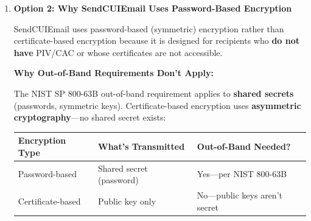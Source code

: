 \documentclass[11pt,letterpaper]{article}
\newcommand{\dmsection}[1]{\item \textbf{#1}\par}
\begin{document}
\begin{enumerate}
\textbf{Implementation (Outlook):}
\begin{enumerate}
    \item Compose email with CUI files attached
    \item Click \textbf{Sign} (uses your PIV/CAC private key)
    \item Click \textbf{Encrypt} (uses recipient's public certificate)
    \item Send
\end{enumerate}

\textbf{When to Use:}
\begin{itemize}
    \item Both parties have PIV/CAC with valid certificates
    \item Recipient's certificate is accessible (same organization, directory service, or previously exchanged)
    \item Regular communication with established recipients
\end{itemize}

\textbf{Note:} In this scenario, SendCUIEmail is \textbf{not needed}---use Outlook's native S/MIME instead.

\dmsection{Option 2: Why SendCUIEmail Uses Password-Based Encryption}

SendCUIEmail uses password-based (symmetric) encryption rather than certificate-based encryption because it is designed for recipients who \textbf{do not have} PIV/CAC or whose certificates are not accessible.

\textbf{Why Out-of-Band Requirements Don't Apply:}

The NIST SP 800-63B out-of-band requirement applies to \textbf{shared secrets} (passwords, symmetric keys). Certificate-based encryption uses \textbf{asymmetric cryptography}---no shared secret exists:

\begin{tabularx}{\textwidth}{|l|l|X|}
\hline
\textbf{Encryption Type} & \textbf{What's Transmitted} & \textbf{Out-of-Band Needed?} \\
\hline
Password-based & Shared secret (password) & Yes---per NIST 800-63B \\
\hline
Certificate-based & Public key only & No---public keys aren't secret \\
\hline
\end{tabularx}

\vspace{12pt}


\end{enumerate}
\end{document}

